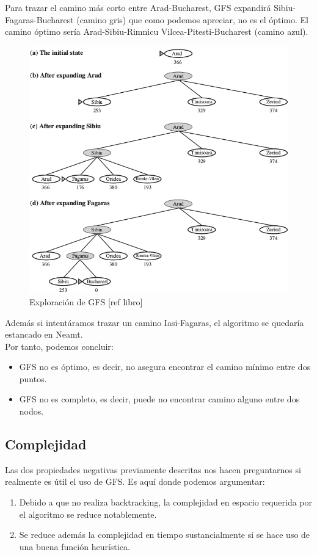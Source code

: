 \documentclass[conference]{IEEEtran}
\begin{document}
{Para trazar el camino más corto entre Arad-Bucharest, GFS expandirá Sibiu-Fagaras-Bucharest (camino gris) que como podemos apreciar, no es el óptimo. El camino óptimo sería Arad-Sibiu-Rimnicu Vilcea-Pitesti-Bucharest (camino azul).
\begin{figure}[H]
\centerline{\includegraphics[scale=0.35]{IMAGENES/gfs.png}}
\caption{Exploración de GFS [ref libro]}
\label{fig}
\end{figure}

Además si intentáramos trazar un camino Iasi-Fagaras, el algoritmo se quedaría estancado en Neamt.\\

Por tanto, podemos concluir:
\begin{itemize}
\item GFS no es óptimo, es decir, no asegura encontrar el camino mínimo entre dos puntos.
\item GFS no es completo, es decir, puede no encontrar camino alguno entre dos nodos.
\end{itemize}


\subsection{Complejidad}

Las dos propiedades negativas previamente descritas nos hacen preguntarnos si realmente es útil el uso de GFS. Es aquí donde podemos argumentar:
\begin{enumerate}
\item Debido a que no realiza backtracking, la complejidad en espacio requerida por el algoritmo se reduce notablemente.
\item Se reduce además la complejidad en tiempo sustancialmente si se hace uso de una buena función heurística.
\end{enumerate}

}
\end{document}
